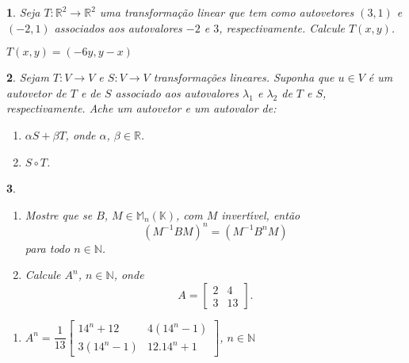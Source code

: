 \documentclass[12pt]{exam}
\newtheorem{exercicio}{}
\newcommand{\real}{\mathbb{R}}
\newcommand{\cp}[1]{\mathbb{#1}}
\begin{document}
\begin{exercicio}
  Seja $T : \real^2 \to \real^2$ uma transforma\c{c}\~ao linear que tem como autovetores $(3,1)$ e $(-2,1)$ associados aos autovalores $-2$ e $3$, respectivamente. Calcule $T(x,y)$.
  \begin{solucao}
    $T(x,y) = (-6y, y -x)$
  \end{solucao}
\end{exercicio}

\begin{exercicio}
  Sejam $T : V \to V$ e $S : V \to V$ transforma\c{c}\~oes lineares. Suponha que $u \in V$ \'e um autovetor de $T$ e de $S$ associado aos autovalores $\lambda_1$ e $\lambda_2$ de $T$ e $S$, respectivamente. Ache um autovetor e um autovalor de:
  \begin{enumerate}[label=({\alph*})]
    \item $\alpha S + \beta T$, onde $\alpha$, $\beta \in \real$.
    \item $S \circ T$.
  \end{enumerate}
\end{exercicio}

\begin{exercicio}
  \begin{enumerate}[label=({\alph*})]
    \item Mostre que se $B$, $M \in \cp{M}_n(\cp{K})$, com $M$ invert{\'\i}vel, ent\~ao
    \[
        (M^{-1}BM)^n = (M^{-1}B^nM)
    \]
    para todo $n \in \cp{N}$.
    \item Calcule $A^n$, $n \in \cp{N}$, onde
    \[
      A = \begin{bmatrix}
        2 & 4\\
        3 & 13
      \end{bmatrix}.
    \]
  \end{enumerate}
  \begin{solucao}
    \begin{enumerate}
    \item[b)] $A^n = \dfrac{1}{13}\begin{bmatrix}
      14^n + 12 & 4(14^n - 1)\\3(14^n - 1) & 12.14^n + 1
    \end{bmatrix}$, $n \in \cp{N}$
  \end{enumerate}
  \end{solucao}
\end{exercicio}
\end{document}
